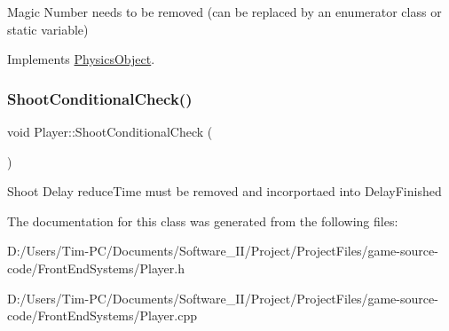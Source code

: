 Magic Number needs to be removed (can be replaced by an enumerator class or static variable) 

Implements \hyperlink{class_physics_object}{Physics\+Object}.

\mbox{\label{class_player_a54bee4abe93eea15c48fdbd85e4fdbd5}} 
\subsubsection{\texorpdfstring{Shoot\+Conditional\+Check()}{ShootConditionalCheck()}}
{\footnotesize\ttfamily void Player\+::\+Shoot\+Conditional\+Check (\begin{DoxyParamCaption}{ }\end{DoxyParamCaption})\hspace{0.3cm}{\ttfamily [private]}}

Shoot Delay reduce\+Time must be removed and incorportaed into Delay\+Finished 

The documentation for this class was generated from the following files\+:\begin{DoxyCompactItemize}
\item 
D\+:/\+Users/\+Tim-\/\+P\+C/\+Documents/\+Software\+\_\+\+I\+I/\+Project/\+Project\+Files/game-\/source-\/code/\+Front\+End\+Systems/Player.\+h\item 
D\+:/\+Users/\+Tim-\/\+P\+C/\+Documents/\+Software\+\_\+\+I\+I/\+Project/\+Project\+Files/game-\/source-\/code/\+Front\+End\+Systems/Player.\+cpp\end{DoxyCompactItemize}
